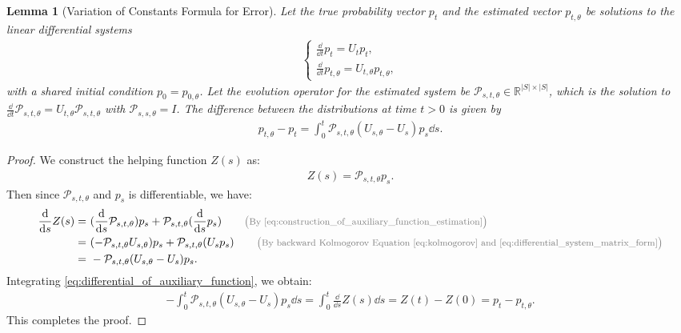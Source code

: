 \documentclass[12pt]{article}
\numberwithin{equation}{section}
\theoremstyle{theoremstyle}
\newtheorem{lemma}{Lemma}[section]
\numberwithin{equation}{section}
\numberwithin{theorem}{section}
\numberwithin{proposition}{section}
\numberwithin{definition}{section}
\numberwithin{lemma}{section}
\numberwithin{assumption}{section}
\numberwithin{remark}{section}
\newcommand*{\annot}[1]{\tag*{\footnotesize{\textcolor{black!50}{\big(#1\big)}}}}
\begin{document}
\begin{lemma}
[Variation of Constants Formula for Error]
\label{lem:error_integral_formula}
Let the true probability vector $p_t$ and the estimated vector $p_{t,\theta}$ be solutions to the linear differential systems
\begin{align}
\label{eq:differential_system_matrix_form}
    \begin{cases}
    \frac{\dd}{\dd t}p_t= U_tp_t, \\
    \frac{\dd}{\dd t}p_{t,\theta}= U_{t,\theta}p_{t,\theta},
    \end{cases}
\end{align}
with a shared initial condition $p_0 = p_{0,\theta}$. 
Let the evolution operator for the estimated system be $\mathcal{P}_{s,t,\theta}\in\mathbb{R}^{|S|\times|S|}$, which is the solution to $\frac{\dd}{\dd t}\mathcal{P}_{s,t,\theta} = U_{t,\theta}\mathcal{P}_{s,t,\theta}$ with $\mathcal{P}_{s,s,\theta}=I$. 
The difference between the distributions at time $t>0$ is given by
\begin{align*}
    p_{t,\theta} - p_t
    = \int_0^t \mathcal{P}_{s,t,\theta}(U_{s,\theta}-U_s)p_s \dd s.
\end{align*}
\end{lemma}

\begin{proof}
We construct the helping function $Z(s)$ as:
\begin{align}\label{eq:construction_of_auxiliary_function_estimation}
    Z(s)=\mathcal{P}_{s,t,\theta}p_s.
\end{align}
Then since $\mathcal{P}_{s,t,\theta}$ and $p_s$ is differentiable, we have:
\begin{align}
    \frac{\dd}{\dd s}Z(s) = & ~(\frac{\dd}{\dd s}\mathcal{P}_{s,t,\theta})p_s+\mathcal{P}_{s,t,\theta}(\frac{\dd}{\dd s}p_s) \annot{By \eqref{eq:construction_of_auxiliary_function_estimation}}\\
    = & ~
    (-\mathcal{P}_{s,t,\theta}U_{s,\theta})p_s+\mathcal{P}_{s,t,\theta}(U_sp_s) 
    \annot{By backward Kolmogorov Equation \eqref{eq:kolmogorov} and \eqref{eq:differential_system_matrix_form}}\\
    = & ~ \label{eq:differential_of_auxiliary_function}
    -\mathcal{P}_{s,t,\theta}(U_{s,\theta}-U_s)p_s.
\end{align}
Integrating \eqref{eq:differential_of_auxiliary_function}, we obtain:
\begin{align*}
    -\int_0^t \mathcal{P}_{s,t,\theta}(U_{s,\theta}-U_s)p_s \dd s=\int_0^t \frac{\dd}{\dd s}Z(s) \dd s= Z(t)-Z(0)=p_t-p_{t,\theta}.
\end{align*}
This completes the proof.
\end{proof}
\end{document}

